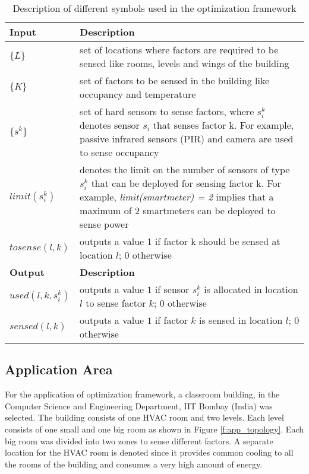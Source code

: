 \begin{table}[h]
	\caption{Description of different symbols used in the optimization framework}
	\centering
	\begin{tabular}{p{}|p{}}
		\hline
		\textbf{Input} & \textbf{Description}
		\\ \hline
		$\{L\}$                           & set of locations where factors are required to be sensed like rooms, levels and wings of the building
		\\ \hline
		$ \{K\} $                         & set of factors to be sensed in the building like occupancy and temperature
		\\ \hline
		$\{s^k\}$ & set of hard sensors to sense factors, where $s_i^k$ denotes sensor $s_i$ that senses factor k. For example, passive infrared sensors (PIR) and camera are used to sense occupancy
		\\ \hline
		$limit(s_i^k)$ & denotes the limit on the number of sensors of type $s_i^k$ that can be deployed for sensing factor k. For example, \textit{limit(smartmeter) = 2} implies that a maximum of 2 smartmeters can be deployed to sense power
		\\ \hline
		$tosense(l,k)$ & outputs a value 
		1 if factor k should be sensed at location $l$; 0 otherwise
		\\ \hline
		\textbf{Output} & \textbf{Description} 
		\\ \hline
		$used(l,k,s_i^k)$  &  outputs a value $1$ if sensor $s_i^k$ is allocated in location $l$ to sense factor $k$; $0$ otherwise 
		\\ \hline
		$sensed(l,k)$    & outputs a value $1$ if factor $k$ is sensed in location $l$; $0$ otherwise
		\\ \hline
	\end{tabular}
	\label{tab:var}
\end{table}

\subsection{Application Area}

For the application of optimization framework, a classroom building, in  
the Computer Science and Engineering Department, IIT Bombay (India) was selected. The building consists of one HVAC room and two levels. Each level consists of one small and one big room as shown in Figure \ref{f:app_topology}. Each big room was divided into two zones to sense different factors. A separate location for the HVAC room is denoted since it provides common cooling to all the rooms of the building and consumes a very high amount of energy. 


